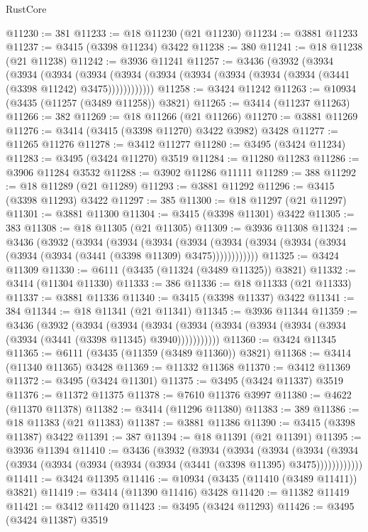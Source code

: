 \begin{lexlean}{RustCore}
\begin{coremodule}
@11230 := 381
@11233 := @18 @11230 (@21 @11230)
@11234 := @3881 @11233
@11237 := @3415 (@3398 @11234) @3422
@11238 := 380
@11241 := @18 @11238 (@21 @11238)
@11242 := @3936 @11241
@11257 := @3436
    (@3932
      (@3934
        (@3934
          (@3934
            (@3934 (@3934 (@3934 (@3934 (@3934 (@3934 (@3934 (@3441 (@3398 @11242) @3475))))))))))))
@11258 := @3424 @11242
@11263 := @10934 (@3435 (@11257 (@3489 @11258)) @3821)
@11265 := @3414 (@11237 @11263)
@11266 := 382
@11269 := @18 @11266 (@21 @11266)
@11270 := @3881 @11269
@11276 := @3414 (@3415 (@3398 @11270) @3422 @3982) @3428
@11277 := @11265 @11276
@11278 := @3412 @11277
@11280 := @3495 (@3424 @11234)
@11283 := @3495 (@3424 @11270) @3519
@11284 := @11280 @11283
@11286 := @3906 @11284 @3532
@11288 := @3902 @11286 @11111
@11289 := 388
@11292 := @18 @11289 (@21 @11289)
@11293 := @3881 @11292
@11296 := @3415 (@3398 @11293) @3422
@11297 := 385
@11300 := @18 @11297 (@21 @11297)
@11301 := @3881 @11300
@11304 := @3415 (@3398 @11301) @3422
@11305 := 383
@11308 := @18 @11305 (@21 @11305)
@11309 := @3936 @11308
@11324 := @3436
    (@3932
      (@3934
        (@3934
          (@3934
            (@3934 (@3934 (@3934 (@3934 (@3934 (@3934 (@3934 (@3441 (@3398 @11309) @3475))))))))))))
@11325 := @3424 @11309
@11330 := @6111 (@3435 (@11324 (@3489 @11325)) @3821)
@11332 := @3414 (@11304 @11330)
@11333 := 386
@11336 := @18 @11333 (@21 @11333)
@11337 := @3881 @11336
@11340 := @3415 (@3398 @11337) @3422
@11341 := 384
@11344 := @18 @11341 (@21 @11341)
@11345 := @3936 @11344
@11359 := @3436
    (@3932
      (@3934
        (@3934
          (@3934 (@3934 (@3934 (@3934 (@3934 (@3934 (@3934 (@3441 (@3398 @11345) @3940)))))))))))
@11360 := @3424 @11345
@11365 := @6111 (@3435 (@11359 (@3489 @11360)) @3821)
@11368 := @3414 (@11340 @11365) @3428
@11369 := @11332 @11368
@11370 := @3412 @11369
@11372 := @3495 (@3424 @11301)
@11375 := @3495 (@3424 @11337) @3519
@11376 := @11372 @11375
@11378 := @7610 @11376 @3997
@11380 := @4622 (@11370 @11378)
@11382 := @3414 (@11296 @11380)
@11383 := 389
@11386 := @18 @11383 (@21 @11383)
@11387 := @3881 @11386
@11390 := @3415 (@3398 @11387) @3422
@11391 := 387
@11394 := @18 @11391 (@21 @11391)
@11395 := @3936 @11394
@11410 := @3436
    (@3932
      (@3934
        (@3934
          (@3934
            (@3934 (@3934 (@3934 (@3934 (@3934 (@3934 (@3934 (@3441 (@3398 @11395) @3475))))))))))))
@11411 := @3424 @11395
@11416 := @10934 (@3435 (@11410 (@3489 @11411)) @3821)
@11419 := @3414 (@11390 @11416) @3428
@11420 := @11382 @11419
@11421 := @3412 @11420
@11423 := @3495 (@3424 @11293)
@11426 := @3495 (@3424 @11387) @3519

\end{coremodule}
\end{lexlean}
